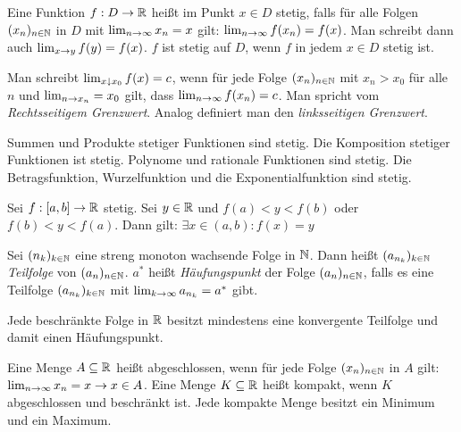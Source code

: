 \begin{definition}[Stetigkeit]
	Eine Funktion $f : D \rightarrow \mathbb{R}$ heißt im Punkt $x \in D$ stetig, falls für alle Folgen $(x_n)_{n \in \mathbb{N}}$ in $D$ mit $\lim_{n \rightarrow \infty} x_n = x$ gilt: $\lim_{n \rightarrow \infty} f(x_n) = f(x)$. Man schreibt dann auch $\lim_{x \rightarrow y} f(y) = f(x)$. $f$ ist stetig auf $D$, wenn $f$ in jedem $x \in D$ stetig ist. 
\end{definition}

\begin{definition}
	Man schreibt $\lim_{x \downarrow x_0} f(x) = c$, wenn für jede Folge $(x_n)_{n \in \mathbb{N}}$ mit $x_n > x_0$ für alle $n$ und $\lim_{n \rightarrow x_n} = x_0$ gilt, dass $\lim_{n \rightarrow \infty} f(x_n) = c$. Man spricht vom \emph{Rechtsseitigem Grenzwert}. Analog definiert man den \emph{linksseitigen Grenzwert}.
\end{definition}

\begin{satz}
	Summen und Produkte stetiger Funktionen sind stetig. Die Komposition stetiger Funktionen ist stetig. Polynome und rationale Funktionen sind stetig. Die Betragsfunktion, Wurzelfunktion und die Exponentialfunktion sind stetig.
\end{satz}

\begin{satz}[Zwischenwertsatz]
	Sei $f : [a,b] \rightarrow \mathbb{R}$ stetig. Sei $y \in \mathbb{R}$ und $f(a) < y < f(b)$ oder $f(b) < y < f(a)$. Dann gilt: $\exists x \in (a,b) : f(x) = y$
\end{satz}

\begin{satz}
	Sei $(n_k)_{k \in \mathbb{N}}$ eine streng monoton wachsende Folge in $\mathbb{N}$. Dann heißt  $(a_{n_k})_{k \in \mathbb{N}}$ \emph{Teilfolge} von $(a_{n})_{n \in \mathbb{N}}$. $a^*$ heißt \emph{Häufungspunkt} der Folge  $(a_{n})_{n \in \mathbb{N}}$, falls es eine Teilfolge  $(a_{n_k})_{k \in \mathbb{N}}$ mit $\lim_{k \rightarrow \infty} a_{n_k} = a^*$ gibt.
\end{satz}

\begin{satz}
	Jede beschränkte Folge in $\mathbb{R}$ besitzt mindestens eine konvergente Teilfolge und damit einen Häufungspunkt.
\end{satz}

\begin{definition}
	Eine Menge $A \subseteq \mathbb{R}$ heißt abgeschlossen, wenn für jede Folge $(x_n)_{n \in \mathbb{N}}$ in $A$ gilt: $\lim_{n \rightarrow \infty} x_n = x \rightarrow x\in A$. Eine Menge $K \subseteq \mathbb{R}$ heißt kompakt, wenn $K$ abgeschlossen und beschränkt ist. Jede kompakte Menge besitzt ein Minimum und ein Maximum.
\end{definition}

